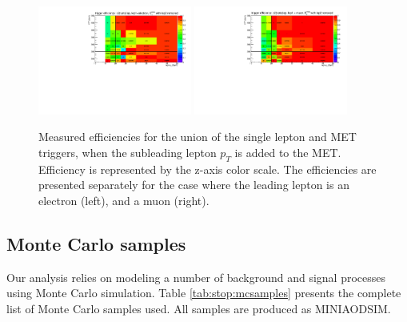 \begin{figure}[htb]
\centering
\includegraphics[width=0.45\textwidth]{figures/TriggerEff2l_el.pdf}
\includegraphics[width=0.45\textwidth]{figures/TriggerEff2l_mu.pdf}
\caption{Measured efficiencies for the union of the single lepton and
  MET triggers, when the subleading lepton $p_T$ is added to the
  MET. Efficiency is represented by the z-axis color scale. The
  efficiencies are presented separately for the case where
  the leading lepton is an electron (left), and a muon (right).}
\label{fig:stop:trigeff:2ndlepplusmet}
\end{figure}


\subsection{Monte Carlo samples}
\label{ssec:stop:mcsamples}

Our analysis relies on modeling a number of background and signal
processes using Monte Carlo simulation. Table \ref{tab:stop:mcsamples}
presents the complete list of Monte Carlo samples used. All samples
are produced as MINIAODSIM.

